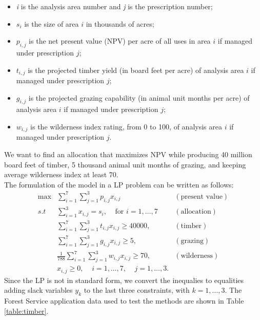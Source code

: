 \documentclass[a4paper,10 pt,titlepage,twoside]{report}
\theoremstyle{plain}
\theoremstyle{definition}
\theoremstyle{remark}
\begin{document}
{{\begin{itemize}
	\item \textit{i} is the analysis area number and \textit{j} is the prescription number;
	\item $s_{i}$ is the size of area $i$ in thousands of acres;
	\item $p_{i,j}$ is the net present value (NPV) per acre of all uses in area $i$ if managed under prescription $j$;
	\item $t_{i,j}$ is the projected timber yield (in board feet per acre) of analysis area $i$ if managed under prescription $j$;
	\item $g_{i,j}$ is the projected grazing capability (in animal unit months per acre) of analysis area $i$ if managed under prescription $j$;
	\item $w_{i,j}$ is the wilderness index rating, from 0 to 100, of analysis area $i$ if managed under prescription $j$.
\end{itemize}
We want to find an allocation that maximizes NPV while producing 40 million board feet of timber, 5 thousand animal unit months of grazing, and keeping average wilderness index at least 70.\\
The formulation of the model in a LP problem can be written as follows:
\begin{align*}
\max&\sum_{i=1}^{7}\sum_{j=1}^{3} p_{i,j}x_{i,j}&(\text{present value})\\
s.t\;\; & \sum_{i=1}^{3}x_{i,j}=s_{i},\;\;\;\;\text{for }i = 1, \dots,7&(\text{allocation})\\
&\sum_{i=1}^{7}\sum_{j=1}^{3} t_{i,j}x_{i,j}\geq 40000,&(\text{timber})\\
&\sum_{i=1}^{7}\sum_{j=1}^{3} g_{i,j}x_{i,j}\geq5,&(\text{grazing})\\
&\frac{1}{788}\sum_{i=1}^{7}\sum_{j=1}^{3} w_{i,j}x_{i,j}\geq 70,&(\text{wilderness})\\
&x_{i,j}\geq 0, \;\;\;\;i = 1,\dots,7,\;\;\;\;j = 1,\dots,3.
\end{align*}
Since the LP is not in standard form, we convert the inequalies to equalities adding slack variables $y_{k}$ to the last three constraints, with $k = 1, \dots, 3$. The Forest Service application data used to test the methods are shown in Table \ref{table:timber}.
\begin{table}[]
	\begin{tabular}{cccllll}
		\hline

\end{tabular}
\end{table}}}
\end{document}
